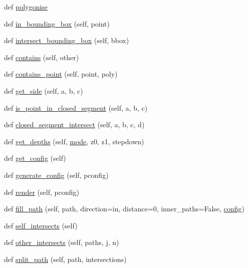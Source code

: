 \begin{DoxyCompactItemize}
def \hyperlink{classpath_1_1_path_a3b54a01d175b9b051d694caa30cf28a0}{polygonise}
\item 
def \hyperlink{classpath_1_1_path_a17c5f43e1c156a296bd7448defd8c946}{in\+\_\+bounding\+\_\+box} (self, point)
\item 
def \hyperlink{classpath_1_1_path_af354f0b26b8ba4d21a902dab71c69920}{intersect\+\_\+bounding\+\_\+box} (self, bbox)
\item 
def \hyperlink{classpath_1_1_path_a0058f9bd843f63eaeb85ea717d9f2138}{contains} (self, other)
\item 
def \hyperlink{classpath_1_1_path_a753dbb17e43cf5e39d5f637d03658cf0}{contains\+\_\+point} (self, point, poly)
\item 
def \hyperlink{classpath_1_1_path_ad82178ddd7330372c472291e73309bee}{get\+\_\+side} (self, a, b, c)
\item 
def \hyperlink{classpath_1_1_path_aca1366e16e6617c73438bf83bcd5fa00}{is\+\_\+point\+\_\+in\+\_\+closed\+\_\+segment} (self, a, b, c)
\item 
def \hyperlink{classpath_1_1_path_a06b9c5f2189c6ff577a74a1bbab010e3}{closed\+\_\+segment\+\_\+intersect} (self, a, b, c, d)
\item 
def \hyperlink{classpath_1_1_path_adc90cd9e5cfbed6ba42868adc708222f}{get\+\_\+depths} (self, \hyperlink{classpath_1_1_path_ab4089a2e9ac6e1b0539f194a572f4960}{mode}, z0, z1, stepdown)
\item 
def \hyperlink{classpath_1_1_path_a4cade06157627d90509e751e167e1d96}{get\+\_\+config} (self)
\item 
def \hyperlink{classpath_1_1_path_a8f8b471ad54b528e2455a64a7a4c890d}{generate\+\_\+config} (self, pconfig)
\item 
def \hyperlink{classpath_1_1_path_a4c13dbe9e125454eca037eacec681056}{render} (self, pconfig)
\item 
def \hyperlink{classpath_1_1_path_a29f7e2494e80aa23b6d548dac6781a8a}{fill\+\_\+path} (self, path, direction=\textquotesingle{}in\textquotesingle{}, distance=0, inner\+\_\+paths=False, \hyperlink{classpath_1_1_path_a889e352f02dba833077975ce855276ed}{config})
\item 
def \hyperlink{classpath_1_1_path_a23f0bfc7551364a56fa47cdaeb4ca69a}{self\+\_\+intersects} (self)
\item 
def \hyperlink{classpath_1_1_path_adc00ccbbee85cdc2ec80c8ed85f40311}{other\+\_\+intersects} (self, paths, j, n)
\item 
def \hyperlink{classpath_1_1_path_abe1106d4dd28e45cd6cdb084e899d875}{split\+\_\+path} (self, path, intersections)

\end{DoxyCompactItemize}
